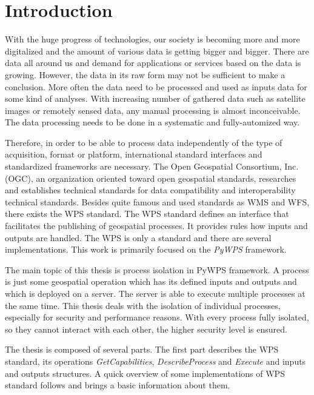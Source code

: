 \documentclass[12pt,a4paper]{article}
\newcommand{\necislovana}[1]{%
\phantomsection
\addcontentsline{toc}{section}{#1}



\section*{#1}
\markboth{\uppercase{#1}}{}
}
\begin{document}
\newpage
\tableofcontents

\newpage
\pagestyle{fancy}

\necislovana{Introduction} 
With the huge progress of technologies, our society is becoming more and more digitalized and the amount of various data 
is getting bigger and bigger. There are data all around us and demand for applications or services based on the data is
growing. However, the data in its raw form may not be sufficient to make a conclusion. More often the data need to be 
processed and used as inputs data for some kind of analyses. With increasing number of gathered data such as
satellite images or remotely sensed data, any manual processing is almost inconceivable. The data processing needs to
be done in a systematic and fully-automized way.

Therefore, in order to be able to process data independently of the type of acquisition, format or platform, 
international standard interfaces and standardized frameworks are necessary. The Open Geospatial Consortium, Inc. 
(OGC), an organization oriented toward open geospatial standards, researches and establishes technical standards for 
data compatibility and interoperability technical standards. Besides quite famous and used standards as WMS and WFS, 
there exists the WPS standard. The WPS standard defines an interface that facilitates the publishing of geospatial 
processes. It provides rules how inputs and outputs are handled. The WPS is only a standard and there are several 
implementations. This work is primarily focused on the \textit{PyWPS} framework.

\bigskip
The main topic of this thesis is process isolation in PyWPS framework. A process is just some geospatial operation which 
has its defined inputs and outputs and which is deployed on a server. The server is able to execute multiple 
processes at the same time. This thesis deals with the isolation of individual processes, especially for security and 
performance reasons. With every process fully isolated, so they cannot interact with each other, the higher security 
level is ensured.

The thesis is composed of several parts. The first part describes the WPS standard, its operations 
\textit{GetCapabilities}, \textit{DescribeProcess} and \textit{Execute} and inputs and outputs structures. A quick
overview of some implementations of WPS standard follows and brings a basic information about them.
\end{document}
